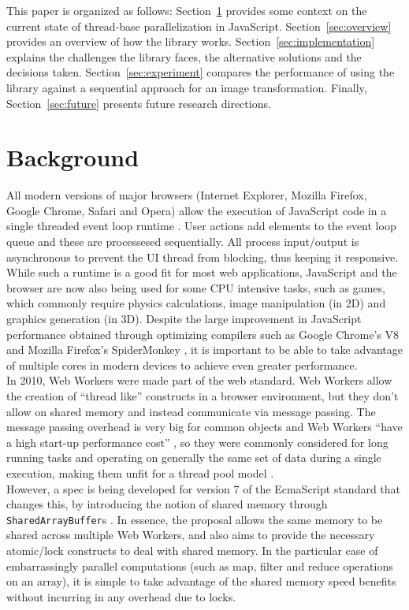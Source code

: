 \documentclass[runningheads,a4paper]{llncs}
\begin{document}
This paper is organized as follows: Section~\ref{sec:background} provides some context on the current state of thread-base parallelization in JavaScript. Section~\ref{sec:overview} provides an overview of how the library works. Section~\ref{sec:implementation} explains the challenges the library faces, the alternative solutions and the decisions taken. Section~\ref{sec:experiment} compares the performance of using the library against a sequential approach for an image transformation. Finally, Section~\ref{sec:future} presents future research directions.

\section{Background}\label{sec:background}
All modern versions of major browsers (Internet Explorer, Mozilla Firefox, Google Chrome, Safari and Opera) allow the execution of JavaScript code in a single threaded event loop runtime \cite{event-loop}. User actions add elements to the event loop queue and these are processesed sequentially. All process input/output is asynchronous to prevent the UI thread from blocking, thus keeping it responsive.
While such a runtime is a good fit for most web applications, JavaScript and the browser are now also being used for some CPU intensive tasks, such as games, which commonly require physics calculations, image manipulation (in 2D) and graphics generation (in 3D). Despite the large improvement in JavaScript performance obtained through optimizing compilers such as Google Chrome's V8 \cite{v8} and Mozilla Firefox's SpiderMonkey \cite{spider-monkey}, it is important to be able to take advantage of multiple cores in modern devices to achieve even greater performance.\\
In 2010, Web Workers were made part of the web standard. Web Workers allow the creation of ``thread like'' constructs in a browser environment, but they don't allow on shared memory and instead communicate via message passing. The message passing overhead is very big for common objects and Web Workers ``have a high start-up performance cost'' \cite{w3c-ww}, so they were commonly considered for long running tasks and operating on generally the same set of data during a single execution, making them unfit for a thread pool  model \cite{thread-pool}.\\
However, a spec is being developed for version 7 of the EcmaScript standard that changes this, by introducing the notion of shared memory through \verb+SharedArrayBuffer+s \cite{sab}. In essence, the proposal allows the same memory to be shared across multiple Web Workers, and also aims to provide the necessary atomic/lock constructs to deal with shared memory. In the particular case of embarrassingly parallel computations (such as map, filter and reduce operations on an array), it is simple to take advantage of the shared memory speed benefits without incurring in any overhead due to locks.
\end{document}
